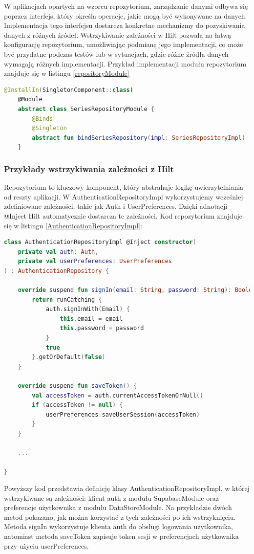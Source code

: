 \documentclass[12pt,twoside]{article}
\begin{document}
W aplikacjach opartych na wzorcu repozytorium, zarządzanie danymi odbywa się poprzez interfejs, który określa 
operacje, jakie mogą być wykonywane na danych. Implementacja tego interfejsu dostarcza konkretne mechanizmy do 
pozyskiwania danych z różnych źródeł. Wstrzykiwanie zależności w Hilt pozwala na łatwą konfigurację repozytorium, 
umożliwiając podmianę jego implementacji, co może być przydatne podczas testów lub w sytuacjach, gdzie różne źródła 
danych wymagają różnych implementacji. Przykład implementacji modułu repozytorium znajduje się w listingu 
\ref{repositoryModule}

\begin{lstlisting}[language=Kotlin,caption=Przykład modułu repozytorium SeriesRepository, label={repositoryModule}]
	@InstallIn(SingletonComponent::class)
	@Module
	abstract class SeriesRepositoryModule {
		@Binds
		@Singleton
		abstract fun bindSeriesRepository(impl: SeriesRepositoryImpl) : SeriesRepository
	}
\end{lstlisting}

\subsubsection{Przykłady wstrzykiwania zależności z Hilt}

Repozytorium to kluczowy komponent, który abstrahuje logikę uwierzytelniania od reszty aplikacji. W 
AuthenticationRepositoryImpl wykorzystujemy wcześniej zdefiniowane zależności, takie jak Auth i UserPreferences. 
Dzięki adnotacji @Inject Hilt automatycznie dostarcza te zależności. Kod repozytorium znajduje się w listingu 
\ref{AuthenticationRepositoryImpl}:

\begin{lstlisting}[language=Kotlin,caption=Implementacja AuthenticationRepository, label={AuthenticationRepositoryImpl}]
	class AuthenticationRepositoryImpl @Inject constructor(
    private val auth: Auth,
    private val userPreferences: UserPreferences
) : AuthenticationRepository {

    override suspend fun signIn(email: String, password: String): Boolean {
        return runCatching {
            auth.signInWith(Email) {
                this.email = email
                this.password = password
            }
            true
        }.getOrDefault(false)
    }

	override suspend fun saveToken() {
        val accessToken = auth.currentAccessTokenOrNull()
        if (accessToken != null) {
            userPreferences.saveUserSession(accessToken)
        }
    }

	...

}
\end{lstlisting}
Powyższy kod przedstawia definicję klasy AuthenticationRepositoryImpl, w której wstrzykiwane są zależności: klient 
auth z modułu SupabaseModule oraz preferencje użytkownika z modułu DataStoreModule. Na przykładzie dwóch metod 
pokazano, jak można korzystać z tych zależności po ich wstrzyknięciu. Metoda signIn wykorzystuje klienta auth do 
obsługi logowania użytkownika, natomiast metoda saveToken zapisuje token sesji w preferencjach użytkownika przy 
użyciu userPreferences.
\end{document}
